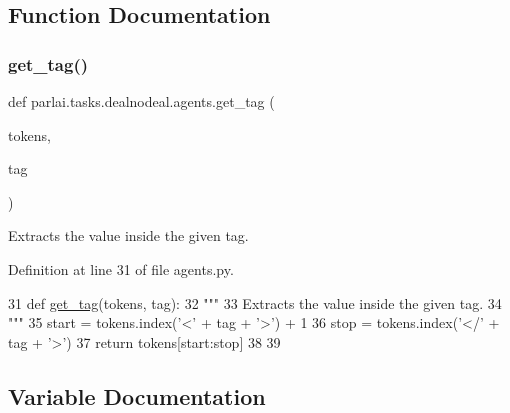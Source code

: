 \subsection{Function Documentation}
\mbox{\label{namespaceparlai_1_1tasks_1_1dealnodeal_1_1agents_a7a1e5d8435af234bbf07491e866bb1fd}} 
\subsubsection{\texorpdfstring{get\+\_\+tag()}{get\_tag()}}
{\footnotesize\ttfamily def parlai.\+tasks.\+dealnodeal.\+agents.\+get\+\_\+tag (\begin{DoxyParamCaption}\item[{}]{tokens,  }\item[{}]{tag }\end{DoxyParamCaption})}

\begin{DoxyVerb}Extracts the value inside the given tag.
\end{DoxyVerb}
 

Definition at line 31 of file agents.\+py.


\begin{DoxyCode}
31 \textcolor{keyword}{def }\hyperlink{namespaceparlai_1_1tasks_1_1onecommon_1_1agents_ad40f47306fdc2563ccac42a81c5620f6}{get\_tag}(tokens, tag):
32     \textcolor{stringliteral}{"""}
33 \textcolor{stringliteral}{    Extracts the value inside the given tag.}
34 \textcolor{stringliteral}{    """}
35     start = tokens.index(\textcolor{stringliteral}{'<'} + tag + \textcolor{stringliteral}{'>'}) + 1
36     stop = tokens.index(\textcolor{stringliteral}{'</'} + tag + \textcolor{stringliteral}{'>'})
37     \textcolor{keywordflow}{return} tokens[start:stop]
38 
39 
\end{DoxyCode}


\subsection{Variable Documentation}
\mbox{\label{namespaceparlai_1_1tasks_1_1dealnodeal_1_1agents_aaadb052506eb0ff949ab5700d6e7d83d}} 
